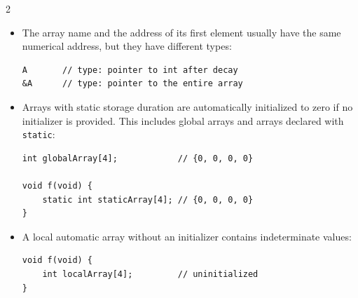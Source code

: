 \documentclass[10pt, portrait]{article}
\begin{document}
\begin{multicols*}{2}
\begin{itemize}
    automatically. The function usually needs a separate size parameter:
    \begin{verbatim}
void printArray(int A[], int size);
    \end{verbatim}
    \item The array name and the address of its first element usually have
    the same numerical address, but they have different types:
    \begin{verbatim}
A       // type: pointer to int after decay
&A      // type: pointer to the entire array
    \end{verbatim}
    \item Arrays with static storage duration are automatically initialized to zero if no initializer is provided. This includes global arrays and arrays declared with \texttt{static}:
    \begin{verbatim}
int globalArray[4];            // {0, 0, 0, 0}

void f(void) {
    static int staticArray[4]; // {0, 0, 0, 0}
}
    \end{verbatim}
    \item A local automatic array without an initializer contains indeterminate values:
    \begin{verbatim}
void f(void) {
    int localArray[4];         // uninitialized
}
    \end{verbatim}
\end{itemize}


\end{multicols*}
\end{document}
